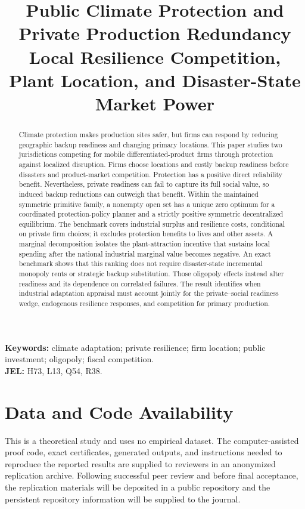 \documentclass[11pt]{article}
\title{\textbf{Public Climate Protection and Private Production Redundancy}\\
\large Local Resilience Competition, Plant Location, and Disaster-State Market Power}
\author{}
\date{}
\theoremstyle{remark}
\begin{document}
\maketitle

\begin{abstract}
Climate protection makes production sites safer, but firms can respond by reducing geographic backup readiness and changing primary locations. This paper studies two jurisdictions competing for mobile differentiated-product firms through protection against localized disruption. Firms choose locations and costly backup readiness before disasters and product-market competition. Protection has a positive direct reliability benefit. Nevertheless, private readiness can fail to capture its full social value, so induced backup reductions can outweigh that benefit. Within the maintained symmetric primitive family, a nonempty open set has a unique zero optimum for a coordinated protection-policy planner and a strictly positive symmetric decentralized equilibrium. The benchmark covers industrial surplus and resilience costs, conditional on private firm choices; it excludes protection benefits to lives and other assets. A marginal decomposition isolates the plant-attraction incentive that sustains local spending after the national industrial marginal value becomes negative. An exact benchmark shows that this ranking does not require disaster-state incremental monopoly rents or strategic backup substitution. Those oligopoly effects instead alter readiness and its dependence on correlated failures. The result identifies when industrial adaptation appraisal must account jointly for the private--social readiness wedge, endogenous resilience responses, and competition for primary production.
\end{abstract}

\noindent\textbf{Keywords:} climate adaptation; private resilience; firm location; public investment; oligopoly; fiscal competition.\\
\textbf{JEL:} H73, L13, Q54, R38.












\section*{Data and Code Availability}
This is a theoretical study and uses no empirical dataset. The computer-assisted proof code, exact certificates, generated outputs, and instructions needed to reproduce the reported results are supplied to reviewers in an anonymized replication archive. Following successful peer review and before final acceptance, the replication materials will be deposited in a public repository and the persistent repository information will be supplied to the journal.
\end{document}
